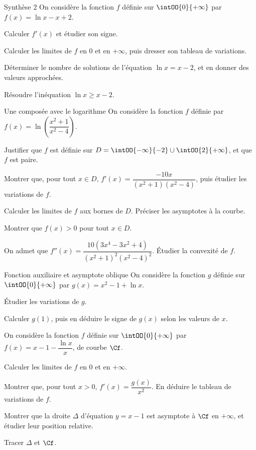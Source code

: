 \begin{exercice}[3]{Synthèse 2}
On considère la fonction $f$ définie sur $\intOO{0}{+\infty}$ par $f(x)=\ln x-x+2$.
\begin{questions}
  \item Calculer $f'(x)$ et étudier son signe.
  \item Calculer les limites de $f$ en $0$ et en $+\infty$, puis dresser son tableau de variations.
  \item Déterminer le nombre de solutions de l'équation $\ln x=x-2$, et en donner des valeurs approchées.
  \item Résoudre l'inéquation $\ln x\geq x-2$.
\end{questions}
\end{exercice}

\begin{exercice}[3]{Une composée avec le logarithme}
On considère la fonction $f$ définie par $f(x)=\ln\left(\dfrac{x^{2}+1}{x^{2}-4}\right)$.
\begin{questions}
  \item Justifier que $f$ est définie sur $D=\intOO{-\infty}{-2}\cup\intOO{2}{+\infty}$, et que $f$ est paire.
  \item Montrer que, pour tout $x\in D$, $f'(x)=\dfrac{-10x}{\left(x^{2}+1\right)\left(x^{2}-4\right)}$, puis étudier les variations de $f$.
  \item Calculer les limites de $f$ aux bornes de $D$. Préciser les asymptotes à la courbe.
  \item Montrer que $f(x)>0$ pour tout $x\in D$.
  \item On admet que $f''(x)=\dfrac{10\left(3x^{4}-3x^{2}+4\right)}{\left(x^{2}+1\right)^{2}\left(x^{2}-4\right)^{2}}$. Étudier la convexité de $f$.
\end{questions}
\end{exercice}

\begin{exercice}[3]{Fonction auxiliaire et asymptote oblique}
On considère la fonction $g$ définie sur $\intOO{0}{+\infty}$ par $g(x)=x^{2}-1+\ln x$.
\begin{questions}
  \item Étudier les variations de $g$.
  \item Calculer $g(1)$, puis en déduire le signe de $g(x)$ selon les valeurs de $x$.
\end{questions}
On considère la fonction $f$ définie sur $\intOO{0}{+\infty}$ par $f(x)=x-1-\dfrac{\ln x}{x}$, de courbe $\Cf$.
\begin{questions}[resume]
  \item Calculer les limites de $f$ en $0$ et en $+\infty$.
  \item Montrer que, pour tout $x>0$, $f'(x)=\dfrac{g(x)}{x^{2}}$. En déduire le tableau de variations de $f$.
  \item Montrer que la droite $\Delta$ d'équation $y=x-1$ est asymptote à $\Cf$ en $+\infty$, et étudier leur position relative.
  \item Tracer $\Delta$ et $\Cf$.
\end{questions}
\end{exercice}

